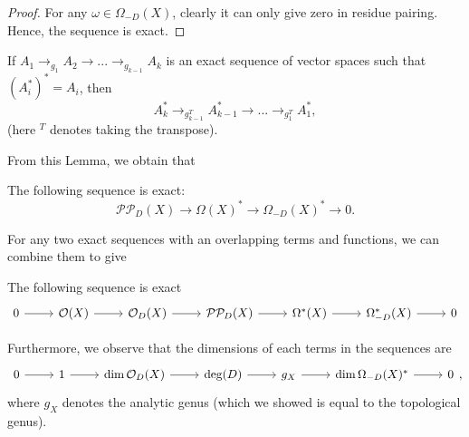 \documentclass{article}
\begin{document}
{\begin{proof}
    For any $\omega \in \Omega_{-D}(X)$, clearly it can only give zero in residue pairing. Hence, the sequence is exact.
\end{proof}


\begin{lemma}
    If $A_1 \to_{g_1} A_2 \to ... \to_{g_{k-1}} A_k$ is an exact sequence of vector spaces such that $(A_i^*)^* = A_i$, then
    \[A^*_k \to_{g_{k-1}^T} A^*_{k-1} \to ... \to_{g_1^{T}} A_1^*,\]
    (here $^T$ denotes taking the transpose).
\end{lemma}

From this Lemma, we obtain that
\begin{proposition}
    The following sequence is exact:
    \[\mathcal{P} \mathcal{P}_D(X) \to \Omega(X)^* \to \Omega_{-D}(X)^* \to 0.\]
\end{proposition}

For any two exact sequences with an overlapping terms and functions, we can combine them to give
\begin{theorem}
    The following sequence is exact
\[\begin{tikzcd}
	0 & {\mathcal{O}(X)} & {\mathcal{O}_D(X)} & {\mathcal{P}\mathcal{P}_D(X)} & {\Omega^*(X)} & {\Omega_{-D}^*(X)} & 0
	\arrow[from=1-1, to=1-2]
	\arrow[from=1-2, to=1-3]
	\arrow[from=1-3, to=1-4]
	\arrow[from=1-4, to=1-5]
	\arrow[from=1-5, to=1-6]
	\arrow[from=1-6, to=1-7]
\end{tikzcd}\]
\end{theorem}

Furthermore, we observe that the dimensions of each terms in the sequences are
\[\begin{tikzcd}
	0 & 1 & {\dim \mathcal{O}_D(X)} & {\deg(D)} & {g_X} & {\dim \Omega_{-D}(X)^*} & 0
	\arrow[from=1-1, to=1-2]
	\arrow[from=1-2, to=1-3]
	\arrow[from=1-3, to=1-4]
	\arrow[from=1-4, to=1-5]
	\arrow[from=1-5, to=1-6]
	\arrow[from=1-6, to=1-7]
\end{tikzcd},\]
where $g_X$ denotes the analytic genus (which we showed is equal to the topological genus).\\

}
\end{document}
